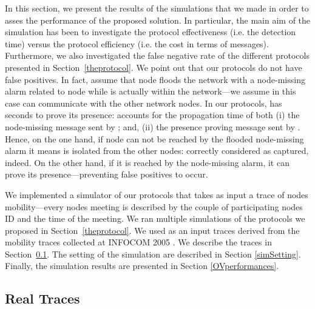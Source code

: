 \documentclass{IEEEconf}
\begin{document}
In this section, we present the results of the simulations that we made in order to asses the performance of the proposed solution. In particular, the main aim of the simulation has been to investigate the protocol effectiveness (i.e. the detection time) versus the protocol efficiency (i.e. the cost in terms of messages). Furthermore, we also investigated the false negative rate of the different protocols presented in Section~\ref{theprotocol}.
We point out that our protocols do not have false positives. In fact, assume that node  floods the network with a node-missing alarm related to node  while  is actually within the network---we assume in this case  can communicate with the other network nodes. In our protocols,  has  seconds to prove its presence:  accounts for the propagation time of both (i) the node-missing message sent by ; and, (ii) the presence proving message sent by . Hence, on the one hand, if node  can not be reached by the flooded node-missing alarm it means  is isolated from the other nodes: correctly considered as captured, indeed.
On the other hand, if it is reached by the node-missing alarm, it can prove its presence---preventing false positives to occur.



We implemented a simulator of our protocols that takes as input a trace of nodes mobility---every nodes meeting is described by the couple of participating nodes ID and the time of the meeting.
We ran multiple simulations of the protocols we proposed in Section~\ref{theprotocol}. We used as an input traces derived from the mobility traces collected at INFOCOM 2005 \cite{CRAWDAD-INFOCOM}. We describe the traces in Section~\ref{the-infocom-trace}. The setting of the simulation are described in Section \ref{simSetting}. Finally, the simulation results are presented in Section \ref{OVperformances}.









\subsection{Real Traces}
\label{the-infocom-trace}
\end{document}
